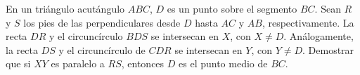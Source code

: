 En un triángulo acutángulo $ABC$, $D$ es un punto sobre el segmento $BC$. Sean $R$ y $S$ los pies de las perpendiculares desde $D$ hasta $AC$ y $AB$, respectivamente. La recta $DR$ y el circuncírculo $BDS$ se intersecan en $X$, con $X \neq D$. Análogamente, la recta $DS$ y el circuncírculo de $CDR$ se intersecan en $Y$, con $Y \neq D$. Demostrar que si $XY$ es paralelo a $RS$, entonces $D$ es el punto medio de $BC.$